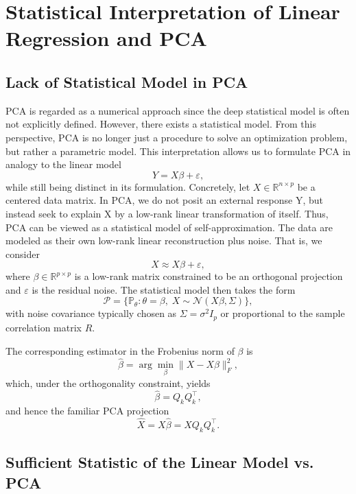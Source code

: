 \section{Statistical Interpretation of Linear Regression and PCA}


\subsection{Lack of Statistical Model in PCA}

PCA is regarded as a numerical approach since the deep statistical model is often not explicitly defined. However, there exists a statistical model. From this perspective, PCA is no longer just a procedure to solve an optimization problem, but rather a parametric model. This interpretation allows us to formulate PCA in analogy to the linear model
\[
Y = X \beta + \varepsilon,
\]
while still being distinct in its formulation. Concretely, let $X \in \mathbb{R}^{n \times p}$ be a centered data matrix. In PCA, we do not posit an external response Y, but instead seek to explain X by a low-rank linear transformation of itself. Thus, PCA can be viewed as a statistical model of self-approximation. The data are modeled as their own low-rank linear reconstruction plus noise. That is, we consider
\[
X \approx X \beta + \varepsilon,
\]
where $\beta \in \mathbb{R}^{p \times p}$ is a low-rank matrix constrained to be an orthogonal projection and $\varepsilon$ is the residual noise. The statistical model then takes the form
\[
\mathcal{P} = \{ \mathbb{P}_\theta : \theta = \beta, \; X \sim \mathcal{N}(X \beta, \Sigma) \},
\]
with noise covariance typically chosen as $\Sigma = \sigma^2 I_p$ or proportional to the sample correlation matrix $R$.

The corresponding estimator in the Frobenius norm of $\beta$ is
\[
\hat{\beta} = \arg\min_{\beta} \| X - X \beta \|_F^2,
\]
which, under the orthogonality constraint, yields
\[
\hat{\beta} = Q_k Q_k^\top,
\]
and hence the familiar PCA projection
\[
\widehat{X} = X \hat{\beta} = X Q_k Q_k^\top.
\]

\subsection{Sufficient Statistic of the Linear Model vs. PCA}

